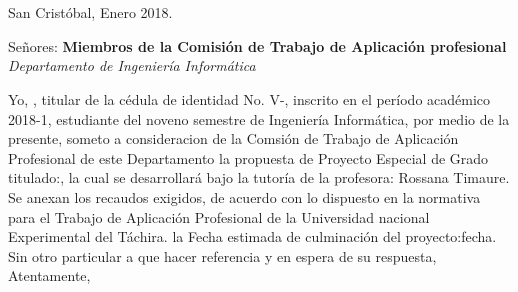 \chapter*{}
\pagestyle{empty}
\thispagestyle{empty}
\begin{flushright}
San Crist\'obal, Enero 2018.
\end{flushright}


\begin{flushleft}
Se\~nores:
\textbf{Miembros de la Comisi\'on de Trabajo de Aplicaci\'on profesional}
\textit{Departamento de Ingenier\'ia Inform\'atica}
\end{flushleft}



	Yo, , titular de la c\'edula de identidad No. V-, inscrito en el per\'iodo acad\'emico 2018-1, estudiante del noveno semestre de Ingenier\'ia Inform\'atica, por medio de la presente, someto a consideracion de la Comsi\'on de Trabajo de Aplicaci\'on Profesional de este Departamento la propuesta de Proyecto Especial de Grado titulado:\textbf{}, la cual se desarrollar\'a bajo la tutor\'ia de la profesora: Rossana Timaure.\\
	
	
	Se anexan los recaudos exigidos, de acuerdo con lo dispuesto en la normativa para el Trabajo de Aplicaci\'on Profesional de la Universidad nacional Experimental del T\'achira. la Fecha estimada de culminaci\'on del proyecto:fecha.\\
	
	
	Sin otro particular a que hacer referencia y en espera de su respuesta,\\
	
	
	Atentamente,\\
	
	
	\begin{center}
	
	
	
	\end{center}
	 